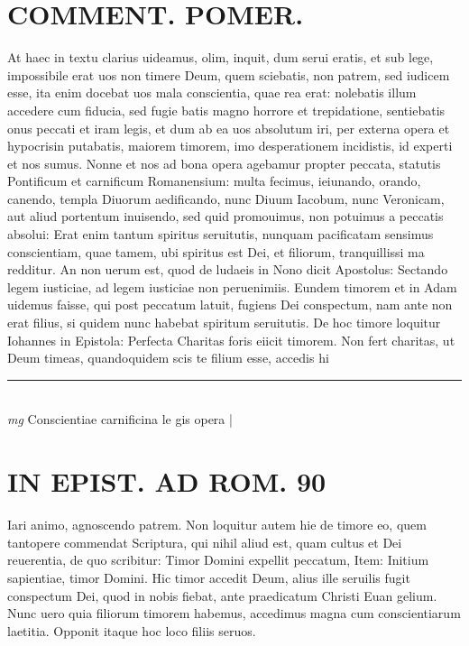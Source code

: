 \documentclass{article}
\begin{document}
\begin{pages}
\section*{COMMENT. POMER.  }\pstart At haec in textu clarius uideamus, olim, inquit, dum serui eratis, et sub lege, impossibile erat uos non timere Deum, quem sciebatis, non patrem, sed iudicem esse, ita enim docebat uos mala conscientia, quae rea erat: nolebatis illum accedere cum fiducia, sed fugie batis magno horrore et trepidatione, sentiebatis onus peccati et iram legis, et dum ab ea uos absolutum iri, per externa opera et hypocrisin putabatis, maiorem timorem, imo desperationem incidistis, id experti et nos sumus. Nonne et nos ad bona opera agebamur propter peccata, statutis Pontificum et carnificum Romanensium: multa fecimus, ieiunando, orando, canendo, templa Diuorum aedificando, nunc Diuum Iacobum, nunc Veronicam, aut aliud portentum inuisendo, sed quid promouimus, non potuimus a peccatis absolui: Erat enim tantum spiritus seruitutis, nunquam pacificatam sensimus conscientiam, quae tamem, ubi spiritus est Dei, et filiorum, tranquillissi ma redditur. An non uerum est, quod de ludaeis in Nono dicit Apostolus: Sectando legem iusticiae, ad legem iusticiae non peruenimiis. Eundem timorem et in Adam uidemus faisse, qui post peccatum latuit, fugiens Dei conspectum, nam ante non erat filius, si quidem nunc habebat spiritum seruitutis. De hoc timore loquitur Iohannes in Epistola: Perfecta Charitas foris eiicit timorem. Non fert charitas, ut Deum timeas, quandoquidem scis te filium esse, accedis hi  \pend
\vspace{0.5cm}\noindent
\vspace{0.2cm}\rule{1cm}{0.2pt}\\ 
\hspace{0.2cm}\textit{mg}
\footnotesize Conscientiae carnificina le gis opera 
\normalsize| 
\section*{IN EPIST. AD ROM.  90 }
\marginpar{[ p.]}\pstart Iari animo, agnoscendo patrem. Non loquitur autem hie de timore eo, quem tantopere commendat Scriptura, qui nihil aliud est, quam cultus et Dei reuerentia, de quo scribitur: Timor Domini expellit peccatum, Item: Initium sapientiae, timor Domini. Hic timor accedit Deum, alius ille seruilis fugit conspectum Dei, quod in nobis fiebat, ante praedicatum Christi Euan gelium. Nunc uero quia filiorum timorem habemus, accedimus magna cum conscientiarum laetitia. Opponit itaque hoc loco filiis seruos.  \pend
{}
{}

\end{pages}
\end{document}
